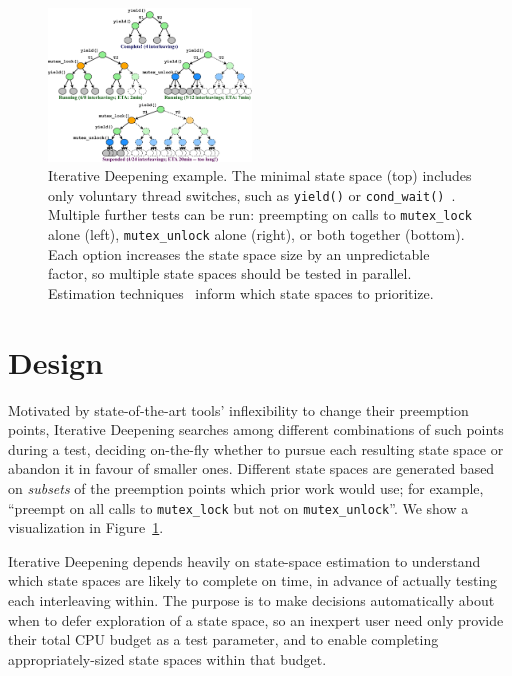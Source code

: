 \begin{figure}[t]
	\includegraphics[width=0.48\textwidth]{trees.pdf}
	\caption{Iterative Deepening example.
		The minimal state space (top) includes only voluntary thread switches, such as {\tt yield()} or {\tt cond\_wait()}~\cite{landslide}.
		Multiple further tests can be run: preempting on calls to {\tt mutex\_lock} alone (left), {\tt mutex\_unlock} alone (right), or both together (bottom).
Each option increases the state space size by an unpredictable factor, so multiple state spaces should be tested in parallel.
Estimation techniques~\cite{estimation} inform which state spaces to prioritize.
}
	\label{fig:id}
\end{figure}
\section{Design}

Motivated by state-of-the-art tools' inflexibility to change their preemption points,
Iterative Deepening searches among different combinations of such points during a test,
deciding on-the-fly whether to pursue each resulting state space or abandon it in favour of smaller ones.
Different state spaces are generated based on {\em subsets} of the preemption points which prior work would use; for example, ``preempt on all calls to {\tt mutex\_lock} but not on {\tt mutex\_unlock}''.
We show a visualization in Figure~\ref{fig:id}.

Iterative Deepening depends heavily on state-space estimation \cite{estimation}
to understand which state spaces are likely to complete on time,
in advance of actually testing each interleaving within.
The purpose is to make decisions automatically about when to defer exploration of a state space,
so an inexpert user need only provide their total CPU budget as a test parameter,
and to enable completing appropriately-sized state spaces within that budget.

